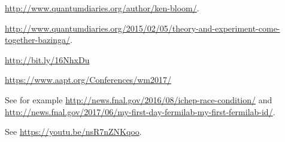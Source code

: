 \begin{thebibliography}{99}
 \url{http://www.quantumdiaries.org/author/ken-bloom/}.

 \url{http://www.quantumdiaries.org/2015/02/05/theory-and-experiment-come-together-bazinga/}.

 \url{http://bit.ly/16NhxDu}

 \url{https://www.aapt.org/Conferences/wm2017/}

 See for example \url{http://news.fnal.gov/2016/08/ichep-race-condition/} and \url{http://news.fnal.gov/2017/06/my-first-day-fermilab-my-first-fermilab-id/}.

 See \url{https://youtu.be/nsR7nZNKqoo}.

\end{thebibliography}
